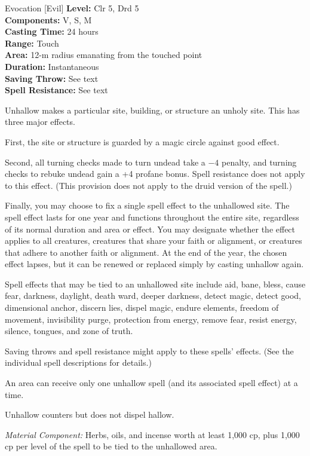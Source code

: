 {Evocation [Evil]}
{
	\textbf{Level:}
	Clr 5, Drd 5\\
	\textbf{Components:}
	V, S, M\\
	\textbf{Casting Time:}
	24 hours\\
	\textbf{Range:}
	Touch\\
	\textbf{Area:}
	12-m radius emanating from the touched point\\
	\textbf{Duration:}
	Instantaneous\\
	\textbf{Saving Throw:}
	See text\\
	\textbf{Spell Resistance:}
	See text\\
}
{
	Unhallow makes a particular site, building, or structure an unholy site. This has three major effects.

	First, the site or structure is guarded by a magic circle against good effect.

	Second, all turning checks made to turn undead take a $-4$ penalty, and turning checks to rebuke undead gain a +4 profane bonus. Spell resistance does not apply to this effect. (This provision does not apply to the druid version of the spell.)

	Finally, you may choose to fix a single spell effect to the unhallowed site. The spell effect lasts for one year and functions throughout the entire site, regardless of its normal duration and area or effect. You may designate whether the effect applies to all creatures, creatures that share your faith or alignment, or creatures that adhere to another faith or alignment. At the end of the year, the chosen effect lapses, but it can be renewed or replaced simply by casting unhallow again.

	Spell effects that may be tied to an unhallowed site include aid, bane, bless, cause fear, darkness, daylight, death ward, deeper darkness, detect magic, detect good, dimensional anchor, discern lies, dispel magic, endure elements, freedom of movement, invisibility purge, protection from energy, remove fear, resist energy, silence, tongues, and zone of truth.

Saving throws and spell resistance might apply to these spells' effects. (See the individual spell descriptions for details.)

	An area can receive only one unhallow spell (and its associated spell effect) at a time.

	Unhallow counters but does not dispel hallow.

	\textit{Material Component:}
	Herbs, oils, and incense worth at least 1,000 cp, plus 1,000 cp per level of the spell to be tied to the unhallowed area.

}
